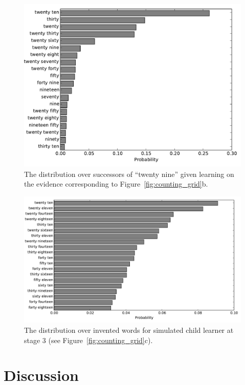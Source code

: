 \documentclass[10pt,letterpaper]{article}
\begin{document}
\begin{figure}
\includegraphics[width=0.9\linewidth]{figures/after29}
\caption{The distribution over successors of ``twenty nine'' given learning on the evidence corresponding to Figure~\ref{fig:counting_grid}b. \label{fig:after29}}
\end{figure}


\begin{figure}
\includegraphics[width=0.9\linewidth]{figures/inventedWords}
\caption{The distribution over invented words for simulated child
  learner at stage
  3 (see Figure~\ref{fig:counting_grid}c). \label{fig:inventedWords}}
\end{figure}


\section{Discussion}


\end{document}
